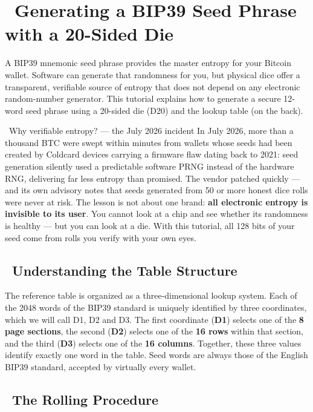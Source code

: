 \documentclass[10pt]{article}
\begin{document}
\section*{\faBitcoin~Generating a BIP39 Seed Phrase with a 20-Sided Die}

\footnotesize

A BIP39 mnemonic seed phrase provides the master entropy for your Bitcoin wallet. Software can generate that randomness for you, but physical dice offer a transparent, verifiable source of entropy that does not depend on any electronic random-number generator. This tutorial explains how to generate a secure 12-word seed phrase using a 20-sided die (D20) and the lookup table (on the back).

\begin{contextbox}{\faNewspaper~Why verifiable entropy? --- the July 2026 incident}
In July 2026, more than a thousand BTC were swept within minutes from wallets whose seeds had been created by Coldcard devices carrying a firmware flaw dating back to 2021: seed generation silently used a predictable software PRNG instead of the hardware RNG, delivering far less entropy than promised. The vendor patched quickly --- and its own advisory notes that seeds generated from 50 or more honest dice rolls were never at risk. The lesson is not about one brand: \textbf{all electronic entropy is invisible to its user}. You cannot look at a chip and see whether its randomness is healthy --- but you can look at a die. With this tutorial, all 128 bits of your seed come from rolls you verify with your own eyes.
\end{contextbox}

\subsection*{\faTable~Understanding the Table Structure}

The reference table is organized as a three-dimensional lookup system. Each of the 2048 words of the BIP39 standard is uniquely identified by three coordinates, which we will call D1, D2 and D3. The first coordinate (\textbf{D1}) selects one of the \textbf{8 page sections}, the second (\textbf{D2}) selects one of the \textbf{16 rows} within that section, and the third (\textbf{D3}) selects one of the \textbf{16 columns}. Together, these three values identify exactly one word in the table. Seed words are always those of the English BIP39 standard, accepted by virtually every wallet.

\subsection*{~The Rolling Procedure}
\end{document}
